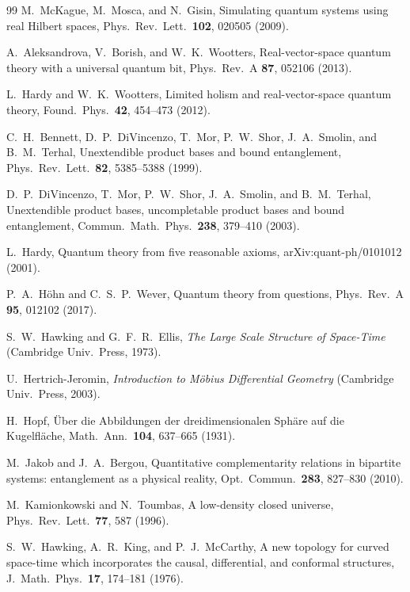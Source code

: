 \documentclass[aps,pra,onecolumn,superscriptaddress,nofootinbib,10pt]{revtex4-2}
\theoremstyle{definition}
\theoremstyle{remark}
\begin{document}
\begin{thebibliography}{99}
 M.~McKague, M.~Mosca, and N.~Gisin, Simulating quantum systems using real Hilbert spaces, Phys.\ Rev.\ Lett.\ \textbf{102}, 020505 (2009).

 A.~Aleksandrova, V.~Borish, and W.~K.~Wootters, Real-vector-space quantum theory with a universal quantum bit, Phys.\ Rev.\ A \textbf{87}, 052106 (2013).

 L.~Hardy and W.~K.~Wootters, Limited holism and real-vector-space quantum theory, Found.\ Phys.\ \textbf{42}, 454--473 (2012).

 C.~H.~Bennett, D.~P.~DiVincenzo, T.~Mor, P.~W.~Shor, J.~A.~Smolin, and B.~M.~Terhal, Unextendible product bases and bound entanglement, Phys.\ Rev.\ Lett.\ \textbf{82}, 5385--5388 (1999).

 D.~P.~DiVincenzo, T.~Mor, P.~W.~Shor, J.~A.~Smolin, and B.~M.~Terhal, Unextendible product bases, uncompletable product bases and bound entanglement, Commun.\ Math.\ Phys.\ \textbf{238}, 379--410 (2003).

 L.~Hardy, Quantum theory from five reasonable axioms, arXiv:quant-ph/0101012 (2001).

 P.~A.~H\"ohn and C.~S.~P.~Wever, Quantum theory from questions, Phys.\ Rev.\ A \textbf{95}, 012102 (2017).

 S.~W.~Hawking and G.~F.~R.~Ellis, \emph{The Large Scale Structure of Space-Time} (Cambridge Univ.\ Press, 1973).

 U.~Hertrich-Jeromin, \emph{Introduction to M\"obius Differential Geometry} (Cambridge Univ.\ Press, 2003).

 H.~Hopf, \"Uber die Abbildungen der dreidimensionalen Sph\"are auf die Kugelfl\"ache, Math.\ Ann.\ \textbf{104}, 637--665 (1931).

 M.~Jakob and J.~A.~Bergou, Quantitative complementarity relations in bipartite systems: entanglement as a physical reality, Opt.\ Commun.\ \textbf{283}, 827--830 (2010).

 M.~Kamionkowski and N.~Toumbas, A low-density closed universe, Phys.\ Rev.\ Lett.\ \textbf{77}, 587 (1996).

 S.~W.~Hawking, A.~R.~King, and P.~J.~McCarthy, A new topology for curved space-time which incorporates the causal, differential, and conformal structures, J.\ Math.\ Phys.\ \textbf{17}, 174--181 (1976).


\end{thebibliography}
\end{document}

